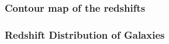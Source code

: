\documentclass{beamer}
\begin{document}
\begin{frame}
	\frametitle{Contour map of the redshifts}
    \begin{figure}
    \end{figure}
    \end{frame}
\begin{frame}
	\frametitle{Redshift Distribution of Galaxies}
    \begin{figure}

    \end{figure}
    \end{frame}
\end{document}
